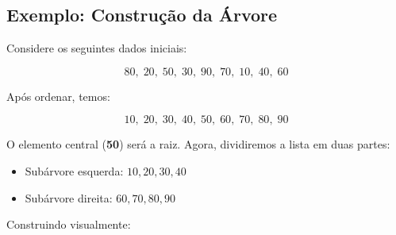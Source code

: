 \documentclass[a4paper,12pt]{article}
\begin{document}
\subsection*{Exemplo: Construção da Árvore}

Considere os seguintes dados iniciais:

\[
80, \; 20, \; 50, \; 30, \; 90, \; 70, \; 10, \; 40, \; 60
\]

\noindent
Após ordenar, temos:

\[
10, \; 20, \; 30, \; 40, \; 50, \; 60, \; 70, \; 80, \; 90
\]

O elemento central (\textbf{50}) será a raiz.  
Agora, dividiremos a lista em duas partes:
\begin{itemize}
    \item Subárvore esquerda: \(10, 20, 30, 40\)
    \item Subárvore direita: \(60, 70, 80, 90\)
\end{itemize}

Construindo visualmente:

\begin{center}
\end{center}
\end{document}
